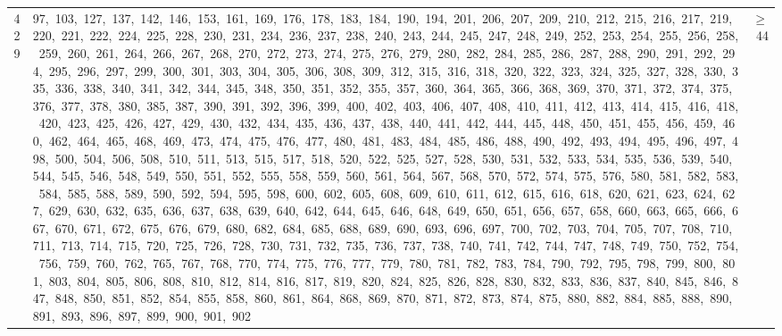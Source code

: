 \begin{longtable}{c|p{}|r}
429 & 97,\ 103,\ 127,\ 137,\ 142,\ 146,\ 153,\ 161,\ 169,\ 176,\ 178,\ 183,\ 184,\ 190,\ 194,\ 201,\ 206,\ 207,\ 209,\ 210,\ 212,\ 215,\ 216,\ 217,\ 219,\ 220,\ 221,\ 222,\ 224,\ 225,\ 228,\ 230,\ 231,\ 234,\ 236,\ 237,\ 238,\ 240,\ 243,\ 244,\ 245,\ 247,\ 248,\ 249,\ 252,\ 253,\ 254,\ 255,\ 256,\ 258,\ 259,\ 260,\ 261,\ 264,\ 266,\ 267,\ 268,\ 270,\ 272,\ 273,\ 274,\ 275,\ 276,\ 279,\ 280,\ 282,\ 284,\ 285,\ 286,\ 287,\ 288,\ 290,\ 291,\ 292,\ 294,\ 295,\ 296,\ 297,\ 299,\ 300,\ 301,\ 303,\ 304,\ 305,\ 306,\ 308,\ 309,\ 312,\ 315,\ 316,\ 318,\ 320,\ 322,\ 323,\ 324,\ 325,\ 327,\ 328,\ 330,\ 335,\ 336,\ 338,\ 340,\ 341,\ 342,\ 344,\ 345,\ 348,\ 350,\ 351,\ 352,\ 355,\ 357,\ 360,\ 364,\ 365,\ 366,\ 368,\ 369,\ 370,\ 371,\ 372,\ 374,\ 375,\ 376,\ 377,\ 378,\ 380,\ 385,\ 387,\ 390,\ 391,\ 392,\ 396,\ 399,\ 400,\ 402,\ 403,\ 406,\ 407,\ 408,\ 410,\ 411,\ 412,\ 413,\ 414,\ 415,\ 416,\ 418,\ 420,\ 423,\ 425,\ 426,\ 427,\ 429,\ 430,\ 432,\ 434,\ 435,\ 436,\ 437,\ 438,\ 440,\ 441,\ 442,\ 444,\ 445,\ 448,\ 450,\ 451,\ 455,\ 456,\ 459,\ 460,\ 462,\ 464,\ 465,\ 468,\ 469,\ 473,\ 474,\ 475,\ 476,\ 477,\ 480,\ 481,\ 483,\ 484,\ 485,\ 486,\ 488,\ 490,\ 492,\ 493,\ 494,\ 495,\ 496,\ 497,\ 498,\ 500,\ 504,\ 506,\ 508,\ 510,\ 511,\ 513,\ 515,\ 517,\ 518,\ 520,\ 522,\ 525,\ 527,\ 528,\ 530,\ 531,\ 532,\ 533,\ 534,\ 535,\ 536,\ 539,\ 540,\ 544,\ 545,\ 546,\ 548,\ 549,\ 550,\ 551,\ 552,\ 555,\ 558,\ 559,\ 560,\ 561,\ 564,\ 567,\ 568,\ 570,\ 572,\ 574,\ 575,\ 576,\ 580,\ 581,\ 582,\ 583,\ 584,\ 585,\ 588,\ 589,\ 590,\ 592,\ 594,\ 595,\ 598,\ 600,\ 602,\ 605,\ 608,\ 609,\ 610,\ 611,\ 612,\ 615,\ 616,\ 618,\ 620,\ 621,\ 623,\ 624,\ 627,\ 629,\ 630,\ 632,\ 635,\ 636,\ 637,\ 638,\ 639,\ 640,\ 642,\ 644,\ 645,\ 646,\ 648,\ 649,\ 650,\ 651,\ 656,\ 657,\ 658,\ 660,\ 663,\ 665,\ 666,\ 667,\ 670,\ 671,\ 672,\ 675,\ 676,\ 679,\ 680,\ 682,\ 684,\ 685,\ 688,\ 689,\ 690,\ 693,\ 696,\ 697,\ 700,\ 702,\ 703,\ 704,\ 705,\ 707,\ 708,\ 710,\ 711,\ 713,\ 714,\ 715,\ 720,\ 725,\ 726,\ 728,\ 730,\ 731,\ 732,\ 735,\ 736,\ 737,\ 738,\ 740,\ 741,\ 742,\ 744,\ 747,\ 748,\ 749,\ 750,\ 752,\ 754,\ 756,\ 759,\ 760,\ 762,\ 765,\ 767,\ 768,\ 770,\ 774,\ 775,\ 776,\ 777,\ 779,\ 780,\ 781,\ 782,\ 783,\ 784,\ 790,\ 792,\ 795,\ 798,\ 799,\ 800,\ 801,\ 803,\ 804,\ 805,\ 806,\ 808,\ 810,\ 812,\ 814,\ 816,\ 817,\ 819,\ 820,\ 824,\ 825,\ 826,\ 828,\ 830,\ 832,\ 833,\ 836,\ 837,\ 840,\ 845,\ 846,\ 847,\ 848,\ 850,\ 851,\ 852,\ 854,\ 855,\ 858,\ 860,\ 861,\ 864,\ 868,\ 869,\ 870,\ 871,\ 872,\ 873,\ 874,\ 875,\ 880,\ 882,\ 884,\ 885,\ 888,\ 890,\ 891,\ 893,\ 896,\ 897,\ 899,\ 900,\ 901,\ 902 & $\ge$ 44 \\

\end{longtable}
